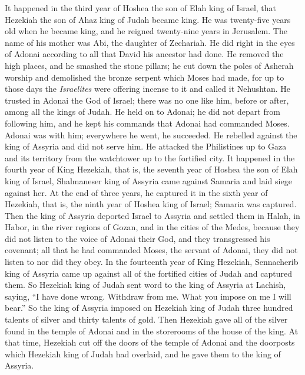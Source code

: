 \begin{biblechapter} %
 It happened in the third year of Hoshea the son of Elah king of Israel, that Hezekiah the son of Ahaz king of Judah became king.
\verse He was twenty-five years old when he became king, and he reigned twenty-nine years in Jerusalem. The name of his mother was Abi, the daughter of Zechariah.
\verse He did right in the eyes of Adonai according to all that David his ancestor had done.
\verse He removed the high places, and he smashed the stone pillars; he cut down the poles of Asherah worship and demolished the bronze serpent which Moses had made, for up to those days the \textit{Israelites} were offering incense to it and called it Nehushtan.
\verse He trusted in Adonai the God of Israel; there was no one like him, before or after, among all the kings of Judah.
\verse He held on to Adonai; he did not depart from following him, and he kept his commands that Adonai had commanded Moses.
\verse Adonai was with him; everywhere he went, he succeeded. He rebelled against the king of Assyria and did not serve him.
\verse He attacked the Philistines up to Gaza and its territory from the watchtower up to the fortified city.
\verse It happened in the fourth year of King Hezekiah, that is, the seventh year of Hoshea the son of Elah king of Israel, Shalmaneser king of Assyria came against Samaria and laid siege against her.
\verse At the end of three years, he captured it in the sixth year of Hezekiah, that is, the ninth year of Hoshea king of Israel; Samaria was captured.
\verse Then the king of Assyria deported Israel to Assyria and settled them in Halah, in Habor, in the river regions of Gozan, and in the cities of the Medes,
\verse because they did not listen to the voice of Adonai their God, and they transgressed his covenant; all that he had commanded Moses, the servant of Adonai, they did not listen to nor did they obey.
 In the fourteenth year of King Hezekiah, Sennacherib king of Assyria came up against all of the fortified cities of Judah and captured them.
\verse So Hezekiah king of Judah sent word to the king of Assyria at Lachish, saying, “I have done wrong. Withdraw from me. What you impose on me I will bear.” So the king of Assyria imposed on Hezekiah king of Judah three hundred talents of silver and thirty talents of gold.
\verse Then Hezekiah gave all of the silver found in the temple of Adonai and in the storerooms of the house of the king.
\verse At that time, Hezekiah cut off the doors of the temple of Adonai and the doorposts which Hezekiah king of Judah had overlaid, and he gave them to the king of Assyria.

\end{biblechapter}
